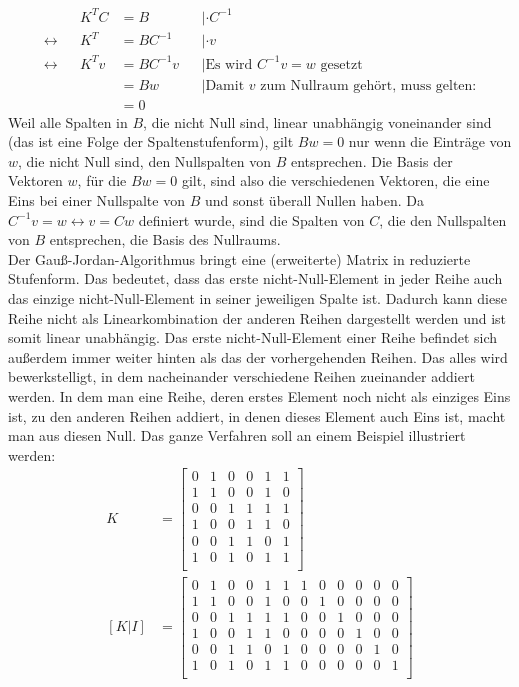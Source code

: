 \documentclass[a4paper,10pt,ngerman]{scrartcl}
\begin{document}
\begin{align*}
&& K^T C &= B  &&|\cdot C^{-1}\\
\leftrightarrow && K^T &= BC^{-1} &&|\cdot v \\
\leftrightarrow && K^T v &= BC^{-1} v && | \text{Es wird $C^{-1}v = w$ gesetzt}\\
&& &= Bw && | \text{Damit $v$ zum Nullraum gehört, muss gelten:}\\
&& &= 0 
\end{align*}
Weil alle Spalten in $B$, die nicht Null sind, linear unabhängig voneinander sind (das ist eine Folge der Spaltenstufenform), gilt $Bw=0$ nur wenn die Einträge von $w$, die nicht Null sind, den Nullspalten von $B$ entsprechen. Die Basis der Vektoren $w$, für die $Bw=0$ gilt, sind also die verschiedenen Vektoren, die eine Eins bei einer Nullspalte von $B$ und sonst überall Nullen haben. Da $C^{-1} v = w \leftrightarrow v = C w$ definiert wurde, sind die Spalten von $C$, die den Nullspalten von $B$ entsprechen, die Basis des Nullraums. \\
Der Gauß-Jordan-Algorithmus bringt eine (erweiterte) Matrix in reduzierte Stufenform. Das bedeutet, dass das erste nicht-Null-Element in jeder Reihe auch das einzige nicht-Null-Element in seiner jeweiligen Spalte ist. Dadurch kann diese Reihe nicht als Linearkombination der anderen Reihen dargestellt werden und ist somit linear unabhängig. Das erste nicht-Null-Element einer Reihe befindet sich außerdem immer weiter hinten als das der vorhergehenden Reihen. Das alles wird bewerkstelligt, in dem nacheinander verschiedene Reihen zueinander addiert werden. In dem man eine Reihe, deren erstes Element noch nicht als einziges Eins ist, zu den anderen Reihen addiert, in denen dieses Element auch Eins ist, macht man aus diesen Null. 
Das ganze Verfahren soll an einem Beispiel illustriert werden:
\begin{align*}
K &= \left[ \begin{array}{cccccc}
0 & 1 & 0 & 0 & 1 & 1 \\
1 & 1 & 0 & 0 & 1 & 0 \\
0 & 0 & 1 & 1 & 1 & 1 \\
1 & 0 & 0 & 1 & 1 & 0 \\
0 & 0 & 1 & 1 & 0 & 1 \\
1 & 0 & 1 & 0 & 1 & 1 \\
\end{array} \right] \\
[K | I] &= \left[ \begin{array}{cccccc|cccccc}
0 & 1 & 0 & 0 & 1 & 1 & 1 & 0 & 0 & 0 & 0 & 0 \\
1 & 1 & 0 & 0 & 1 & 0 & 0 & 1 & 0 & 0 & 0 & 0 \\
0 & 0 & 1 & 1 & 1 & 1 & 0 & 0 & 1 & 0 & 0 & 0 \\
1 & 0 & 0 & 1 & 1 & 0 & 0 & 0 & 0 & 1 & 0 & 0 \\
0 & 0 & 1 & 1 & 0 & 1 & 0 & 0 & 0 & 0 & 1 & 0 \\
1 & 0 & 1 & 0 & 1 & 1 & 0 & 0 & 0 & 0 & 0 & 1 \\
\end{array} \right]
\end{align*} 
\end{document}
